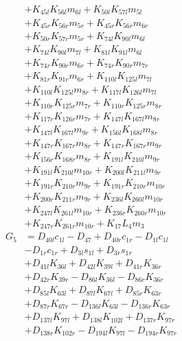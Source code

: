 \begin{multicols}{2}
\begin{align}
&+ K_{45l}K_{56l}m_{6l} + K_{50l}K_{57l}m_{5l}  \nonumber \\
&+ K_{45r}K_{56r}m_{5r} + K_{45r}K_{56r}m_{6r}  \nonumber \\
&+ K_{50r}K_{57r}m_{5r} + K_{74l}K_{90l}m_{6l}  \nonumber \\
&+ K_{74l}K_{90l}m_{7l} + K_{81l}K_{91l}m_{6l}  \nonumber \\
&+ K_{74r}K_{90r}m_{6r} + K_{74r}K_{90r}m_{7r}  \nonumber \\
&+ K_{81r}K_{91r}m_{6r} + K_{110l}K_{125l}m_{7l}  \nonumber \\
&+ K_{110l}K_{125l}m_{8r} + K_{117l}K_{126l}m_{7l}  \nonumber \\
&+ K_{110r}K_{125r}m_{7r} + K_{110r}K_{125r}m_{8r}  \nonumber \\
&+ K_{117r}K_{126r}m_{7r} + K_{147l}K_{167l}m_{8r}  \nonumber \\
&+ K_{147l}K_{167l}m_{9r} + K_{156l}K_{168l}m_{8r}  \nonumber \\
&+ K_{147r}K_{167r}m_{8r} + K_{147r}K_{167r}m_{9r}  \nonumber \\
&+ K_{156r}K_{168r}m_{8r} + K_{191l}K_{210l}m_{9r}  \nonumber \\
&+ K_{191l}K_{210l}m_{10r} + K_{200l}K_{211l}m_{9r}  \nonumber \\
&+ K_{191r}K_{210r}m_{9r} + K_{191r}K_{210r}m_{10r}  \nonumber \\
&+ K_{200r}K_{211r}m_{9r} + K_{236l}K_{260l}m_{10r}  \nonumber \\
&+ K_{247l}K_{261l}m_{10r} + K_{236r}K_{260r}m_{10r}  \nonumber \\
&+ K_{247r}K_{261r}m_{10r} + K_{17}L_4m_3 \nonumber \\
G_{5} &= D_{40l}c_{1l} - D_{47} + D_{40r}c_{1r} - D_{1l}c_{1l}  \nonumber \\
&- D_{1r}c_{1r} + D_{3l}s_{1l} + D_{3r}s_{1r}  \nonumber \\
&+ D_{41l}K_{36l} + D_{42l}K_{39l} + D_{41r}K_{36r}  \nonumber \\
&+ D_{42r}K_{39r} - D_{86l}K_{36l} - D_{86r}K_{36r}  \nonumber \\
&+ D_{85l}K_{63l} + D_{87l}K_{67l} + D_{85r}K_{63r}  \nonumber \\
&+ D_{87r}K_{67r} - D_{136l}K_{63l} - D_{136r}K_{63r}  \nonumber \\
&+ D_{137l}K_{97l} + D_{138l}K_{102l} + D_{137r}K_{97r}  \nonumber \\
&+ D_{138r}K_{102r} - D_{194l}K_{97l} - D_{194r}K_{97r}  \nonumber \\

\end{align}
\end{multicols}
